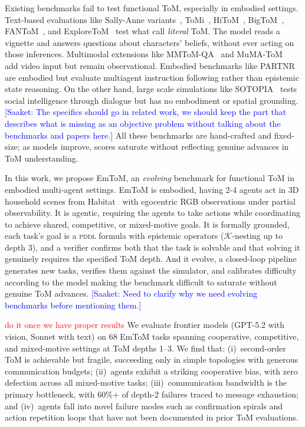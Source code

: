 \documentclass{article} %
\newcommand{\K}{\mathcal{K}}
\newcommand{\pddl}{\textsc{pddl}}
\newcommand{\saaket}[1]{\textcolor{blue}{[Saaket: #1]}}
\newcommand{\g}[1]{\textcolor{red}{#1}}
\begin{document}
Existing benchmarks fail to test functional ToM, especially in embodied settings. Text-based evaluations like Sally-Anne variants~\citep{wimmer1983beliefs}, ToMi~\citep{le2019revisiting}, HiToM~\citep{wu2023hi}, BigToM~\citep{gandhi2024understanding}, FANToM~\citep{kim2023fantom}, and ExploreToM~\citep{exploretom2024} test what \citet{riemer2024broken} call \emph{literal} ToM. The model reads a vignette and answers questions about characters' beliefs, without ever acting on those inferences. Multimodal extensions like MMToM-QA~\citep{mmtomqa2024} and MuMA-ToM~\citep{mumatom2024} add video input but remain observational. Embodied benchmarks like PARTNR~\citep{partnr2024} are embodied but evaluate multiagent instruction following rather than epistemic state reasoning. On the other hand, large scale simulations like SOTOPIA~\citep{sotopia2023} tests social intelligence through dialogue but has no embodiment or spatial grounding. \saaket{The specifics should go in related work, we should keep the part that describes what is missing as an objective problem without talking about the benchmarks and papers here.}
All these benchmarks are hand-crafted and fixed-size; as models improve, scores saturate without reflecting genuine advances in ToM understanding.

In this work, we propose EmToM, an \emph{evolving} benchmark for functional ToM in embodied multi-agent settings. EmToM is embodied, having 2-4 agents act in 3D household scenes from Habitat~\citep{szot2021habitat} with egocentric RGB observations under partial observability. It is agentic, requiring the agents to take actions while coordinating to achieve shared, competitive, or mixed-motive goals. It is formally grounded, each task's goal is a \pddl{} formula with epistemic operators ($\K$-nesting up to depth 3), and a verifier confirms both that the task is solvable and that solving it genuinely requires the specified ToM depth. And it evolve, a closed-loop pipeline generates new tasks, verifies them against the simulator, and calibrates difficulty according to the model making the benchmark difficult to saturate without genuine ToM advances. \saaket{Need to clarify why we need evolving benchmarks before mentioning them.}

\g{do it once we have proper results}
We evaluate frontier models (GPT-5.2 with vision, Sonnet with text) on 68 EmToM tasks spanning cooperative, competitive, and mixed-motive settings at ToM depths 1--3. We find that: (i)~second-order ToM is achievable but fragile, succeeding only in simple topologies with generous communication budgets; (ii)~agents exhibit a striking cooperative bias, with zero defection across all mixed-motive tasks; (iii)~communication bandwidth is the primary bottleneck, with 60\%+ of depth-2 failures traced to message exhaustion; and (iv)~agents fall into novel failure modes such as confirmation spirals and action repetition loops that have not been documented in prior ToM evaluations.
\end{document}

